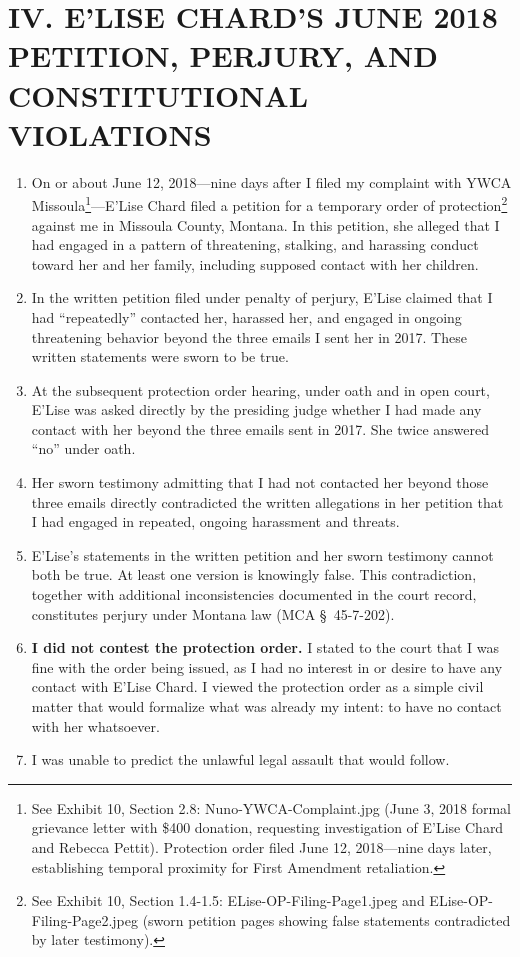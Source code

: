 \documentclass[12pt,letterpaper]{article}
\begin{document}
\section*{IV. E'LISE CHARD'S JUNE 2018 PETITION, PERJURY, AND CONSTITUTIONAL VIOLATIONS}

\begin{enumerate}

\item On or about June 12, 2018---nine days after I filed my complaint with YWCA Missoula\footnote{See Exhibit 10, Section 2.8: Nuno-YWCA-Complaint.jpg (June 3, 2018 formal grievance letter with \$400 donation, requesting investigation of E'Lise Chard and Rebecca Pettit). Protection order filed June 12, 2018---nine days later, establishing temporal proximity for First Amendment retaliation.}---E'Lise Chard filed a petition for a temporary order of protection\footnote{See Exhibit 10, Section 1.4-1.5: ELise-OP-Filing-Page1.jpeg and ELise-OP-Filing-Page2.jpeg (sworn petition pages showing false statements contradicted by later testimony).} against me in Missoula County, Montana. In this petition, she alleged that I had engaged in a pattern of threatening, stalking, and harassing conduct toward her and her family, including supposed contact with her children.

\item In the written petition filed under penalty of perjury, E'Lise claimed that I had ``repeatedly'' contacted her, harassed her, and engaged in ongoing threatening behavior beyond the three emails I sent her in 2017. These written statements were sworn to be true.

\item At the subsequent protection order hearing, under oath and in open court, E'Lise was asked directly by the presiding judge whether I had made any contact with her beyond the three emails sent in 2017. She twice answered ``no'' under oath.

\item Her sworn testimony admitting that I had not contacted her beyond those three emails directly contradicted the written allegations in her petition that I had engaged in repeated, ongoing harassment and threats.

\item E'Lise's statements in the written petition and her sworn testimony cannot both be true. At least one version is knowingly false. This contradiction, together with additional inconsistencies documented in the court record, constitutes perjury under Montana law (MCA \S~45-7-202).

\item \textbf{I did not contest the protection order.} I stated to the court that I was fine with the order being issued, as I had no interest in or desire to have any contact with E'Lise Chard. I viewed the protection order as a simple civil matter that would formalize what was already my intent: to have no contact with her whatsoever.

\item I was unable to predict the unlawful legal assault that would follow.

\end{enumerate}
\end{document}
